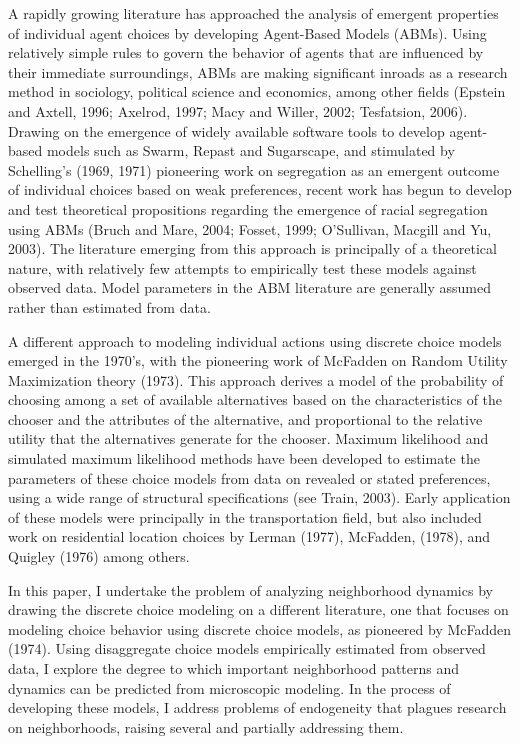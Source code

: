 \documentclass[12pt,a4paper]{article}
\begin{document}
A rapidly growing literature has approached the analysis of
emergent properties of individual agent choices by developing
Agent-Based Models (ABMs). Using relatively simple rules to govern
the behavior of agents that are influenced by their immediate
surroundings, ABMs are making significant inroads as a research
method in sociology, political science and economics, among other
fields (Epstein and Axtell, 1996; Axelrod, 1997; Macy and Willer,
2002; Tesfatsion, 2006). Drawing on the emergence of widely
available software tools to develop agent-based models such as
Swarm, Repast and Sugarscape, and stimulated by Schelling's (1969,
1971) pioneering work on segregation as an emergent outcome of
individual choices based on weak preferences, recent work has
begun to develop and test theoretical propositions regarding the
emergence of racial segregation using ABMs (Bruch and Mare, 2004;
Fosset, 1999; O'Sullivan, Macgill and Yu, 2003).  The literature
emerging from this approach is principally of a theoretical
nature, with relatively few attempts to empirically test these
models against observed data.  Model parameters in the ABM
literature are generally assumed rather than estimated from data.

A different approach to modeling individual actions using discrete
choice models emerged in the 1970's, with the pioneering work of
McFadden on Random Utility Maximization theory (1973). This
approach derives a model of the probability of choosing among a
set of available alternatives based on the characteristics of the
chooser and the attributes of the alternative, and proportional to
the relative utility that the alternatives generate for the
chooser. Maximum likelihood and simulated maximum likelihood
methods have been developed to estimate the parameters of these
choice models from data on revealed or stated preferences, using a
wide range of structural specifications (see Train, 2003). Early
application of these models were principally in the transportation
field, but also included work on residential location choices by
Lerman (1977), McFadden, (1978), and Quigley (1976) among others.

In this paper, I undertake the problem of analyzing neighborhood
dynamics by drawing the discrete choice modeling on a different
literature, one that focuses on modeling choice behavior using
discrete choice models, as pioneered by McFadden (1974). Using
disaggregate choice models empirically estimated from observed
data, I explore the degree to which important neighborhood
patterns and dynamics can be predicted from microscopic modeling.
In the process of developing these models, I address problems of
endogeneity that plagues research on neighborhoods, raising
several and partially addressing them.
\end{document}
